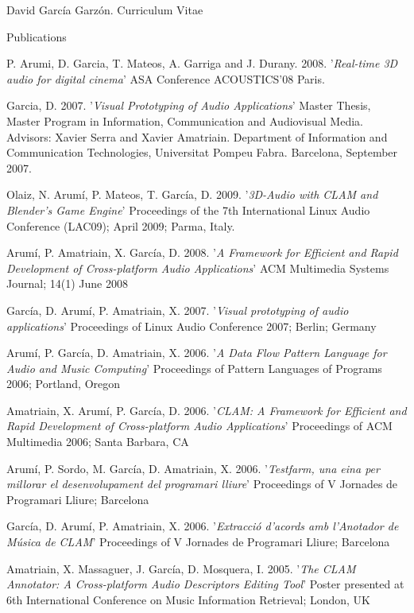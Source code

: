 \documentclass{article}
\begin{document}
\begin{cv}{David García Garzón. Curriculum Vitae}
\begin{cvlist}{Publications}
\item[] {\sc P. Arumi, D. Garcia, T. Mateos, A. Garriga and J. Durany.} 2008.
'{\em Real-time 3D audio for digital cinema}'
ASA Conference ACOUSTICS'08 Paris.

\item[] {\sc Garcia, D.} 2007.
'{\em Visual Prototyping of Audio Applications}'
Master Thesis, Master Program in Information, Communication and Audiovisual Media. Advisors: Xavier Serra and Xavier Amatriain. Department of Information and Communication Technologies, Universitat Pompeu Fabra. Barcelona, September 2007.

\item[] {\sc Olaiz, N. Arumí, P. Mateos, T. García, D.} 2009.
'{\em 3D-Audio with CLAM and Blender's Game Engine}'
Proceedings of the 7th International Linux Audio Conference (LAC09); April 2009; Parma, Italy.

\item[] {\sc Arumí, P. Amatriain, X. García, D.} 2008.
'{\em A Framework for Efficient and Rapid Development of Cross-platform Audio Applications}'
ACM Multimedia Systems Journal; 14(1) June 2008

\item[] {\sc García, D. Arumí, P. Amatriain, X.} 2007.
'{\em Visual prototyping of audio applications}'
Proceedings of Linux Audio Conference 2007; Berlin; Germany

\item[] {\sc Arumí, P. García, D. Amatriain, X.} 2006.
'{\em A Data Flow Pattern Language for Audio and Music Computing}'
Proceedings of Pattern Languages of Programs 2006; Portland, Oregon

\item[] {\sc Amatriain, X. Arumí, P. García, D.} 2006.
'{\em CLAM: A Framework for Efficient and Rapid Development of Cross-platform Audio Applications}'
Proceedings of ACM Multimedia 2006; Santa Barbara, CA

\item[] {\sc Arumí, P. Sordo, M. García, D. Amatriain, X.} 2006.
'{\em Testfarm, una eina per millorar el desenvolupament del programari lliure}'
Proceedings of V Jornades de Programari Lliure; Barcelona

\item[] {\sc García, D. Arumí, P. Amatriain, X.} 2006.
'{\em Extracció d'acords amb l'Anotador de Música de CLAM}'
Proceedings of V Jornades de Programari Lliure; Barcelona

\item[] {\sc Amatriain, X. Massaguer, J. García, D. Mosquera, I.} 2005.
'{\em The CLAM Annotator: A Cross-platform Audio Descriptors Editing Tool}'
Poster presented at 6th International Conference on Music Information Retrieval; London, UK


\end{cvlist}
\end{cv}
\end{document}
